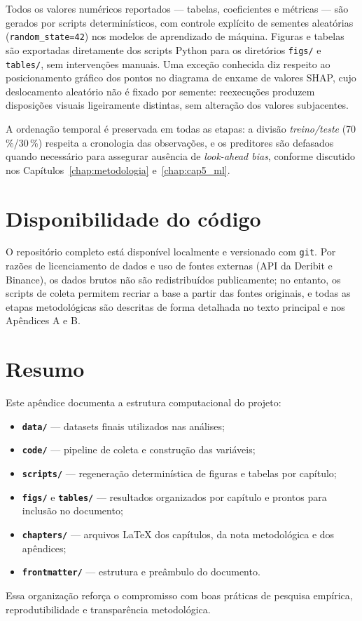 Todos os valores numéricos reportados --- tabelas, coeficientes e métricas
--- são gerados por scripts determinísticos, com controle explícito de
sementes aleatórias (\texttt{random\_state=42}) nos modelos de aprendizado
de máquina. Figuras e tabelas são exportadas diretamente dos scripts Python
para os diretórios \texttt{figs/} e \texttt{tables/}, sem intervenções
manuais. Uma exceção conhecida diz respeito ao posicionamento gráfico dos
pontos no diagrama de enxame de valores SHAP, cujo deslocamento aleatório
não é fixado por semente: reexecuções produzem disposições visuais
ligeiramente distintas, sem alteração dos valores subjacentes.

A ordenação temporal é preservada em todas as etapas: a divisão
\textit{treino/teste} (70\,\%/30\,\%) respeita a cronologia das observações,
e os preditores são defasados quando necessário para assegurar ausência de
\textit{look-ahead bias}, conforme discutido nos
Capítulos~\ref{chap:metodologia} e~\ref{chap:cap5_ml}.

\section{Disponibilidade do código}

O repositório completo está disponível localmente e versionado com
\texttt{git}. Por razões de licenciamento de dados e uso de fontes externas
(API da Deribit e Binance), os dados brutos não são redistribuídos
publicamente; no entanto, os scripts de coleta permitem recriar a base a partir
das fontes originais, e todas as etapas metodológicas são descritas de forma
detalhada no texto principal e nos Apêndices A e B.

\section{Resumo}

Este apêndice documenta a estrutura computacional do projeto:
\begin{itemize}
    \item \textbf{\texttt{data/}} — datasets finais utilizados nas análises;
    \item \textbf{\texttt{code/}} — pipeline de coleta e construção das variáveis;
    \item \textbf{\texttt{scripts/}} — regeneração determinística de figuras e
          tabelas por capítulo;
    \item \textbf{\texttt{figs/}} e \textbf{\texttt{tables/}} — resultados
          organizados por capítulo e prontos para inclusão no documento;
    \item \textbf{\texttt{chapters/}} — arquivos \LaTeX{} dos capítulos,
          da nota metodológica e dos apêndices;
    \item \textbf{\texttt{frontmatter/}} — estrutura e preâmbulo do documento.
\end{itemize}

Essa organização reforça o compromisso com boas práticas de pesquisa empírica,
reprodutibilidade e transparência metodológica.
